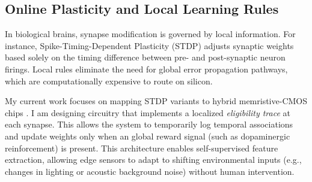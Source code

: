 \subsection{Online Plasticity and Local Learning Rules}
In biological brains, synapse modification is governed by local information. For instance, Spike-Timing-Dependent Plasticity (STDP) adjusts synaptic weights based solely on the timing difference between pre- and post-synaptic neuron firings. Local rules eliminate the need for global error propagation pathways, which are computationally expensive to route on silicon. 

My current work focuses on mapping STDP variants to hybrid memristive-CMOS chips \cite{reynolds2025hybrid}. I am designing circuitry that implements a localized \emph{eligibility trace} at each synapse. This allows the system to temporarily log temporal associations and update weights only when an global reward signal (such as dopaminergic reinforcement) is present. This architecture enables self-supervised feature extraction, allowing edge sensors to adapt to shifting environmental inputs (e.g., changes in lighting or acoustic background noise) without human intervention.
